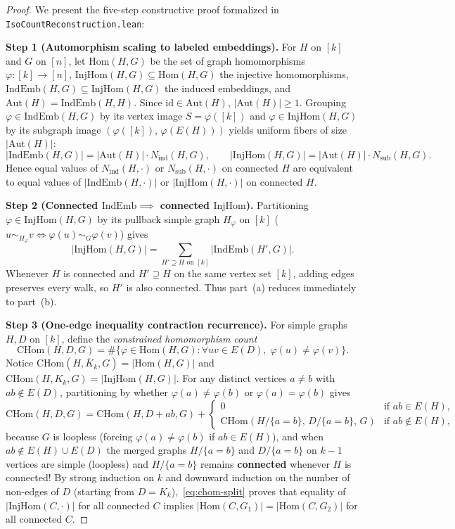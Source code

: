 \documentclass[11pt]{article}
\theoremstyle{definition}
\newcommand{\Nind}{N_{\mathrm{ind}}}
\newcommand{\Nsub}{N_{\mathrm{sub}}}
\newcommand{\Aut}{\mathrm{Aut}}
\newcommand{\Hom}{\mathrm{Hom}}
\newcommand{\InjHom}{\mathrm{InjHom}}
\newcommand{\IndEmb}{\mathrm{IndEmb}}
\newcommand{\CHom}{\mathrm{CHom}}
\begin{document}
\begin{proof}
We present the five-step constructive proof formalized in \texttt{IsoCountReconstruction.lean}:

\textbf{Step 1 (Automorphism scaling to labeled embeddings).} For $H$ on $[k]$ and $G$ on $[n]$, let $\Hom(H, G)$ be the set of graph homomorphisms $\varphi : [k] \to [n]$, $\InjHom(H, G) \subseteq \Hom(H, G)$ the injective homomorphisms, $\IndEmb(H, G) \subseteq \InjHom(H, G)$ the induced embeddings, and $\Aut(H) = \IndEmb(H, H)$. Since $\mathrm{id} \in \Aut(H)$, $|\Aut(H)| \ge 1$. Grouping $\varphi \in \IndEmb(H, G)$ by its vertex image $S = \varphi([k])$ and $\varphi \in \InjHom(H, G)$ by its subgraph image $(\varphi([k]),\, \varphi(E(H)))$ yields uniform fibers of size $|\Aut(H)|$:
\[
  |\IndEmb(H, G)| = |\Aut(H)| \cdot \Nind(H, G), \qquad
  |\InjHom(H, G)| = |\Aut(H)| \cdot \Nsub(H, G).
\]
Hence equal values of $\Nind(H, \cdot)$ or $\Nsub(H, \cdot)$ on connected $H$ are equivalent to equal values of $|\IndEmb(H, \cdot)|$ or $|\InjHom(H, \cdot)|$ on connected $H$.

\textbf{Step 2 (Connected $\IndEmb \implies$ connected $\InjHom$).} Partitioning $\varphi \in \InjHom(H, G)$ by its pullback simple graph $H_\varphi$ on $[k]$ ($u \sim_{H_\varphi} v \iff \varphi(u) \sim_G \varphi(v)$) gives
\[
  |\InjHom(H, G)| = \sum_{H' \supseteq H \text{ on } [k]} |\IndEmb(H', G)|.
\]
Whenever $H$ is connected and $H' \supseteq H$ on the same vertex set $[k]$, adding edges preserves every walk, so $H'$ is also connected. Thus part~(a) reduces immediately to part~(b).

\textbf{Step 3 (One-edge inequality contraction recurrence).} For simple graphs $H, D$ on $[k]$, define the \emph{constrained homomorphism count}
\[
  \CHom(H, D, G) = \#\bigl\{\varphi \in \Hom(H, G) : \forall uv \in E(D),\; \varphi(u) \ne \varphi(v)\bigr\}.
\]
Notice $\CHom(H, \overline{K}_k, G) = |\Hom(H, G)|$ and $\CHom(H, K_k, G) = |\InjHom(H, G)|$. For any distinct vertices $a \ne b$ with $ab \notin E(D)$, partitioning by whether $\varphi(a) \ne \varphi(b)$ or $\varphi(a) = \varphi(b)$ gives
\begin{equation}
\label{eq:chom-split}
  \CHom(H, D, G) = \CHom(H, D + ab, G) +
  \begin{cases}
    0 & \text{if } ab \in E(H),\\
    \CHom(H/\{a=b\},\, D/\{a=b\},\, G) & \text{if } ab \notin E(H),
  \end{cases}
\end{equation}
because $G$ is loopless (forcing $\varphi(a) \ne \varphi(b)$ if $ab \in E(H)$), and when $ab \notin E(H) \cup E(D)$ the merged graphs $H/\{a=b\}$ and $D/\{a=b\}$ on $k - 1$ vertices are simple (loopless) and $H/\{a=b\}$ remains \textbf{connected} whenever $H$ is connected! By strong induction on $k$ and downward induction on the number of non-edges of $D$ (starting from $D = K_k$),~\eqref{eq:chom-split} proves that equality of $|\InjHom(C, \cdot)|$ for all connected $C$ implies $|\Hom(C, G_1)| = |\Hom(C, G_2)|$ for all connected $C$.


\end{proof}
\end{document}
